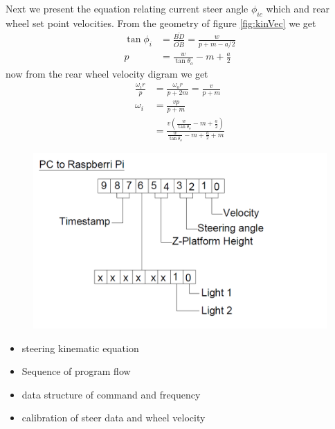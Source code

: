 Next we present  the equation relating current steer angle $\phi_{ic}$ which  and rear wheel  set point velocities. From the geometry of figure \ref{fig:kinVec} we get
\begin{align}
\nonumber \tan\phi_i &=\frac{\bar{BD}}{\bar{OB}}=\frac{w}{p+m-a/2}\\ 
p &= \frac{w}{\tan\theta_o}-m + \frac{a}{2}
\end{align}
now from the rear wheel velocity digram we get
\begin{align}
\nonumber \frac{\omega_i r}{p}&=\frac{\omega_o r}{p+2m}=\frac{v}{p+m}\\
\omega_i &=\frac{vp}{p+m}\\
&=\frac{v( \frac{w}{\tan\theta_o}-m + \frac{a}{2})}{ \frac{w}{\tan\theta_o}-m + \frac{a}{2}+m}
\end{align}
  
\begin{figure}
	\includegraphics[width=\linewidth,keepaspectratio]{Chapter5/fig/bitconfig}
	\label{fig:sentBytes} 
\end{figure}
 
\begin{itemize}
\item steering kinematic equation
\item Sequence of program flow
\item data structure of command  and  frequency
\item calibration of steer data and wheel velocity
\end{itemize}
